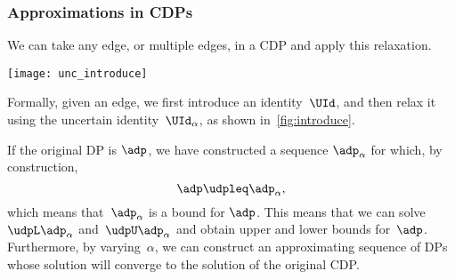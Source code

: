 \vfill\pagebreak

\subsubsection{Approximations in CDPs}

We can take any edge, or multiple edges, in a CDP and apply this relaxation.

\begin{marginfigure}
    \texttt{[image: unc\_introduce]}
    \caption{}
    \label{fig:introduce}
\end{marginfigure}

Formally, given an edge, we first introduce an identity~$\UId$, and then relax it using the uncertain identity~$\UId_{\alpha}$,
as shown in~\cref{fig:introduce}.

If the original DP is $\adp$, we have constructed a sequence $\adp_\alpha$ for which, by construction,
%
\begin{equation}
    \adp\udpleq\adp_{\alpha},
\end{equation}
%
which means that~$\adp_{\alpha}$ is a bound for $\adp$.
This means that we can solve~$\udpL\adp_{\alpha}$ and~$\udpU\adp_{\alpha}$ and obtain upper and lower bounds for~$\adp$.
Furthermore, by varying~$\alpha$, we can construct an approximating sequence of DPs whose solution will converge to the solution of the original CDP.

%

